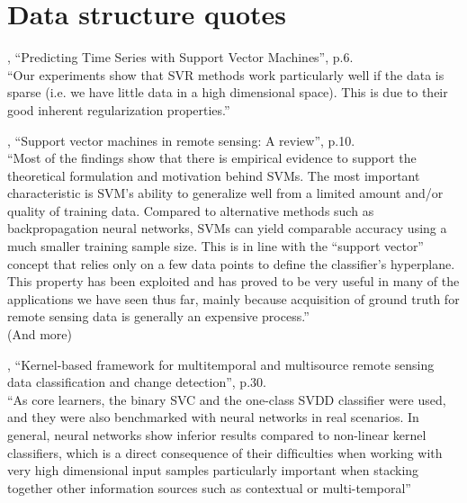 
\chapter{Data structure quotes}

\cite{muller1997predicting}, ``Predicting Time Series with Support Vector Machines'', p.6. \\
``Our experiments show that SVR methods work particularly well if the data is sparse (i.e. we have little data in a high dimensional space). This is due to their good inherent regularization properties.''

\cite{mountrakis2011support}, ``Support vector machines in remote sensing: A review'', p.10. \\
``Most of the findings show that there is empirical evidence to support the theoretical formulation and motivation behind SVMs.
The most important characteristic is SVM’s ability to generalize well from a limited amount and/or quality of training data.
Compared to alternative methods such as backpropagation neural networks, SVMs can yield comparable accuracy using a much smaller training sample size.
This is in line with the ``support vector'' concept that relies only on a few data points to define the classifier's hyperplane.
This property has been exploited and has proved to be very useful in many of the applications we have seen thus far, mainly because acquisition of ground truth for remote sensing data is generally an expensive process.''\\
(And more)

\cite{camps2008kernel}, ``Kernel-based framework for multitemporal and multisource remote sensing data classification and change detection'', p.30. \\
``As core learners, the binary SVC and the one-class SVDD classiﬁer were used, and they were also benchmarked with neural networks in real scenarios.
In general, neural networks show inferior results compared to non-linear kernel classiﬁers, which is a direct consequence of their difﬁculties when working with very high dimensional input samples particularly important when stacking together other information sources such as contextual or multi-temporal''